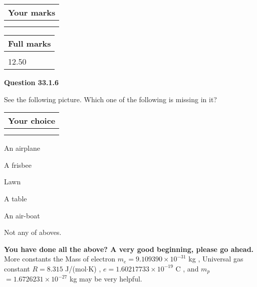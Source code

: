 \documentclass[12pt]{article}
\begin{document}
 
\vspace{0.3in}
  
\vspace{0.2in}
  
         \begin{tabular}{|l|}
\hline
 Your marks  \\
\hline
 \\ 
 \\ 
\hline
\end{tabular}
\hspace{0.05in} \begin{tabular}{|l|}
\hline
 Full marks  \\
\hline
 \\ 
12.50 \\
\hline
\end{tabular}
{\textbf{\Large{Question
33.1.6 
}}}
  
  
See the following picture.
Which one of the following is missing in it?
  
  
\noindent\hspace{3.0in} \begin{tabular}{|l|}
\hline
Your choice \\
\hline
 \\ 
 \\ 
\hline
\end{tabular}
  
  
 
 
An airplane
 
 
A frisbee
 
 
Lawn
 
 
A table
 
 
An air-boat
 
 
  Not any of aboves.
 
 
 
\vspace{0.3in}
   
   
\vspace{0.3in}
{\textbf{\LARGE{You have done all the above? A very good beginning, please go ahead.}}}
More constants the
Mass of electron
$m_e$$ =
9.109390 \times 10^{-31} $
kg
,
Universal gas constant
$R$$ =
8.315 $
J/(mol$\cdot $K)
,
$e$$ =
1.60217733 \times 10^{-19} $
C
, and
$m_p$$ =
1.6726231 \times 10^{-27} $
kg
%
may be very helpful.
\vspace{0.3in}
   
\end{document}
